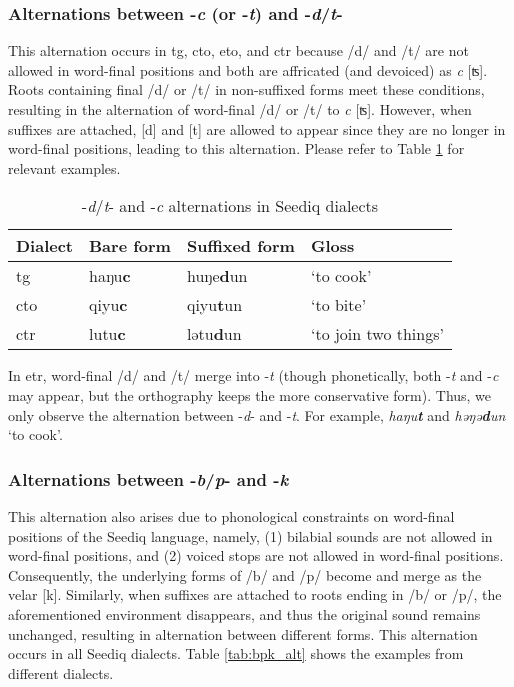 \subsubsection{Alternations between -\textit{c} (or -\textit{t}) and -\textit{d}/\textit{t}-} \label{sec:dtc_alt}

This alternation occurs in \acl{tg}, \acl{cto}, \acl{eto}, and \acl{ctr} because /d/ and /t/ are not allowed in word-final positions and both are affricated (and devoiced) as \textit{c} [ʦ]. Roots containing final /d/ or /t/ in non-suffixed forms meet these conditions, resulting in the alternation of word-final /d/ or /t/ to \textit{c} [ʦ]. However, when suffixes are attached, [d] and [t] are allowed to appear since they are no longer in word-final positions, leading to this alternation. Please refer to Table \ref{tab:dtc_alt} for relevant examples.

\begin{table}[!htbp]
\centering
\caption{-\textit{d}/\textit{t}- and -\textit{c} alternations in Seediq dialects}
\label{tab:dtc_alt}
\begin{tabular}{llll}
\hline
Dialect   & Bare form & Suffixed form & Gloss                \\ \hline
\acl{tg}  & haŋu\textbf{c}     & huŋe\textbf{d}un       & `to cook'            \\
\acl{cto} & qiyu\textbf{c}     & qiyu\textbf{t}un       & `to bite'            \\
\acl{ctr} & lutu\textbf{c}     & lətu\textbf{d}un       & `to join two things' \\ \hline
\end{tabular}
\end{table}

In \acl{etr}, word-final /d/ and /t/ merge into -\textit{t} (though phonetically, both -\textit{t} and -\textit{c} may appear, but the orthography keeps the more conservative form). Thus, we only observe the alternation between -\textit{d}- and -\textit{t}. For example, \textit{haŋu\textbf{t}} and \textit{həŋə\textbf{d}un} `to cook'.

\subsubsection{Alternations between -\textit{b}/\textit{p}- and -\textit{k}}

This alternation also arises due to phonological constraints on word-final positions of the Seediq language, namely, (1) bilabial sounds are not allowed in word-final positions, and (2) voiced stops are not allowed in word-final positions. Consequently, the underlying forms of /b/ and /p/ become and merge as the velar [k]. Similarly, when suffixes are attached to roots ending in /b/ or /p/, the aforementioned environment disappears, and thus the original sound remains unchanged, resulting in alternation between different forms. This alternation occurs in all Seediq dialects. Table \ref{tab:bpk_alt} shows the examples from different dialects. 

